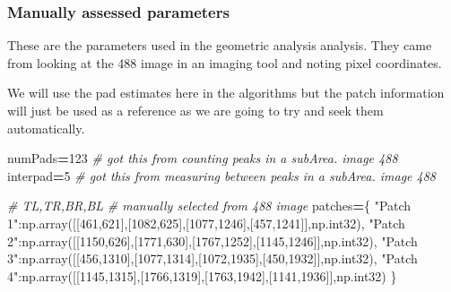 \documentclass[
]{article}
\newenvironment{Shaded}{\begin{snugshade}}{\end{snugshade}}
\newcommand{\CommentTok}[1]{\textcolor[rgb]{0.56,0.35,0.01}{\textit{#1}}}
\newcommand{\DecValTok}[1]{\textcolor[rgb]{0.00,0.00,0.81}{#1}}
\newcommand{\NormalTok}[1]{#1}
\newcommand{\OperatorTok}[1]{\textcolor[rgb]{0.81,0.36,0.00}{\textbf{#1}}}
\newcommand{\StringTok}[1]{\textcolor[rgb]{0.31,0.60,0.02}{#1}}
\begin{document}
\hypertarget{manually-assessed-parameters}{%
\subsubsection{Manually assessed
parameters}\label{manually-assessed-parameters}}

These are the parameters used in the geometric analysis analysis. They
came from looking at the 488 image in an imaging tool and noting pixel
coordinates.

We will use the pad estimates here in the algorithms but the patch
information will just be used as a reference as we are going to try and
seek them automatically.

\begin{Shaded}
\begin{Highlighting}[]

\NormalTok{numPads}\OperatorTok{=}\DecValTok{123} \CommentTok{\# got this from counting peaks in a subArea. image 488}
\NormalTok{interpad}\OperatorTok{=}\DecValTok{5}  \CommentTok{\# got this from measuring between peaks in a subArea. image 488}

\CommentTok{\# TL,TR,BR,BL}
\CommentTok{\# manually selected from 488 image}
\NormalTok{patches}\OperatorTok{=}\NormalTok{\{}
\StringTok{"Patch 1"}\NormalTok{:np.array([[}\DecValTok{461}\NormalTok{,}\DecValTok{621}\NormalTok{],[}\DecValTok{1082}\NormalTok{,}\DecValTok{625}\NormalTok{],[}\DecValTok{1077}\NormalTok{,}\DecValTok{1246}\NormalTok{],[}\DecValTok{457}\NormalTok{,}\DecValTok{1241}\NormalTok{]],np.int32),}
\StringTok{"Patch 2"}\NormalTok{:np.array([[}\DecValTok{1150}\NormalTok{,}\DecValTok{626}\NormalTok{],[}\DecValTok{1771}\NormalTok{,}\DecValTok{630}\NormalTok{],[}\DecValTok{1767}\NormalTok{,}\DecValTok{1252}\NormalTok{],[}\DecValTok{1145}\NormalTok{,}\DecValTok{1246}\NormalTok{]],np.int32),}
\StringTok{"Patch 3"}\NormalTok{:np.array([[}\DecValTok{456}\NormalTok{,}\DecValTok{1310}\NormalTok{],[}\DecValTok{1077}\NormalTok{,}\DecValTok{1314}\NormalTok{],[}\DecValTok{1072}\NormalTok{,}\DecValTok{1935}\NormalTok{],[}\DecValTok{450}\NormalTok{,}\DecValTok{1932}\NormalTok{]],np.int32),}
\StringTok{"Patch 4"}\NormalTok{:np.array([[}\DecValTok{1145}\NormalTok{,}\DecValTok{1315}\NormalTok{],[}\DecValTok{1766}\NormalTok{,}\DecValTok{1319}\NormalTok{],[}\DecValTok{1763}\NormalTok{,}\DecValTok{1942}\NormalTok{],[}\DecValTok{1141}\NormalTok{,}\DecValTok{1936}\NormalTok{]],np.int32)}
\NormalTok{\}}
\end{Highlighting}
\end{Shaded}
\end{document}
